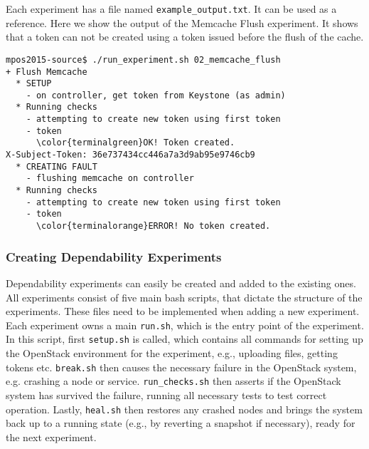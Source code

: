 \begin{appendix}
Each experiment has a file named \texttt{example\_output.txt}. It can be used as a reference. Here we show the output of the Memcache Flush experiment. It shows that a token can not be created using a token issued before the flush of the cache.

\begin{Verbatim}[commandchars=\\\{\}]
mpos2015-source$ ./run_experiment.sh 02_memcache_flush
+ Flush Memcache
  * SETUP
    - on controller, get token from Keystone (as admin)
  * Running checks
    - attempting to create new token using first token
    - token
      \color{terminalgreen}OK! Token created.
X-Subject-Token: 36e737434cc446a7a3d9ab95e9746cb9
  * CREATING FAULT
    - flushing memcache on controller
  * Running checks
    - attempting to create new token using first token
    - token
      \color{terminalorange}ERROR! No token created.
\end{Verbatim}


\subsubsection{Creating Dependability Experiments}
Dependability experiments can easily be created and added to the existing ones. All experiments consist of five main bash scripts, that dictate the structure of the experiments. These files need to be implemented when adding a new experiment.\\

Each experiment owns a main \verb|run.sh|, which is the entry point of the experiment. In this script, first \verb|setup.sh| is called, which contains all commands for setting up the OpenStack environment for the experiment, e.g., uploading files, getting tokens etc. \verb|break.sh| then causes the necessary failure in the OpenStack system, e.g. crashing a node or service. \verb|run_checks.sh| then asserts if the OpenStack system has survived the failure, running all necessary tests to test correct operation. Lastly, \verb|heal.sh| then restores any crashed nodes and brings the system back up to a running state (e.g., by reverting a snapshot if necessary), ready for the next experiment.





\end{appendix}
